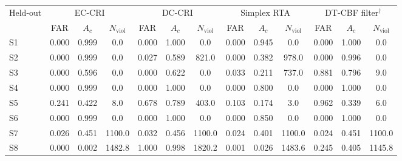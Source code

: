 \begin{tabular}{lcccccccccccc}
\toprule
Held-out & \multicolumn{3}{c}{EC-CRI} & \multicolumn{3}{c}{DC-CRI} & \multicolumn{3}{c}{Simplex RTA} & \multicolumn{3}{c}{DT-CBF filter$^{\dagger}$} \\
 & FAR & $A_c$ & $N_{\mathrm{viol}}$ & FAR & $A_c$ & $N_{\mathrm{viol}}$ & FAR & $A_c$ & $N_{\mathrm{viol}}$ & FAR & $A_c$ & $N_{\mathrm{viol}}$ \\
\midrule
S1 & 0.000 & 0.999 & 0.0 & 0.000 & 1.000 & 0.0 & 0.000 & 0.945 & 0.0 & 0.000 & 1.000 & 0.0 \\
S2 & 0.000 & 0.999 & 0.0 & 0.027 & 0.589 & 821.0 & 0.000 & 0.382 & 978.0 & 0.000 & 0.996 & 0.0 \\
S3 & 0.000 & 0.596 & 0.0 & 0.000 & 0.622 & 0.0 & 0.033 & 0.211 & 737.0 & 0.881 & 0.796 & 9.0 \\
S4 & 0.000 & 0.999 & 0.0 & 0.000 & 1.000 & 0.0 & 0.000 & 0.800 & 0.0 & 0.000 & 1.000 & 0.0 \\
S5 & 0.241 & 0.422 & 8.0 & 0.678 & 0.789 & 403.0 & 0.103 & 0.174 & 3.0 & 0.962 & 0.339 & 6.0 \\
S6 & 0.000 & 0.999 & 0.0 & 0.000 & 1.000 & 0.0 & 0.000 & 0.850 & 0.0 & 0.000 & 1.000 & 0.0 \\
S7 & 0.026 & 0.451 & 1100.0 & 0.032 & 0.456 & 1100.0 & 0.024 & 0.401 & 1100.0 & 0.024 & 0.451 & 1100.0 \\
S8 & 0.000 & 0.002 & 1482.8 & 1.000 & 0.998 & 1820.2 & 0.001 & 0.026 & 1483.6 & 0.245 & 0.405 & 1145.8 \\
\bottomrule
\end{tabular}